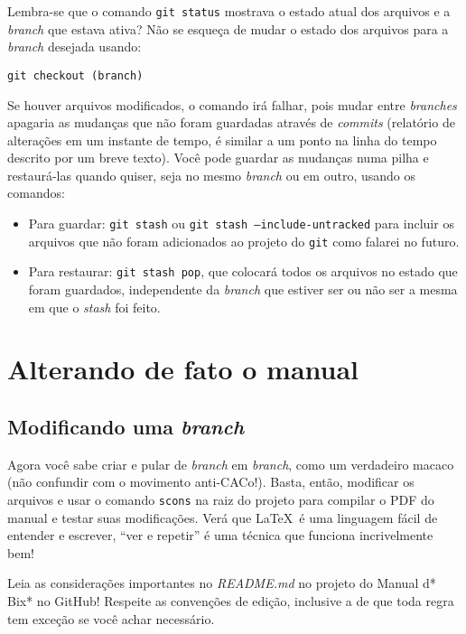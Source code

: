 \documentclass[a4paper,oneside,10pt]{memoir}
\begin{document}
Lembra-se que o comando \texttt{git status} mostrava o estado atual dos
arquivos e a \emph{branch} que estava ativa? Não se esqueça de mudar o estado
dos arquivos para a \emph{branch} desejada usando:

\begin{center}
\texttt{git checkout (branch)}
\end{center}

Se houver arquivos modificados, o comando irá falhar, pois mudar entre
\emph{branches} apagaria as mudanças que não foram guardadas através de
\emph{commits} (relatório de alterações em um instante de tempo, é similar a um
ponto na linha do tempo descrito por um breve texto). Você pode guardar as
mudanças numa pilha e restaurá-las quando quiser, seja no mesmo \emph{branch} ou
em outro, usando os comandos:

\begin{itemize}
\item Para guardar: \texttt{git stash} ou \texttt{git stash
  --include-untracked} para incluir os arquivos que não foram adicionados ao
  projeto do \texttt{git} como falarei no futuro.
\item Para restaurar: \texttt{git stash pop}, que colocará todos os arquivos
  no estado que foram guardados, independente da \emph{branch} que estiver ser
  ou não ser a mesma em que o \emph{stash} foi feito.
\end{itemize}

\section{Alterando de fato o manual}

\subsection{Modificando uma \emph{branch}}

Agora você sabe criar e pular de \emph{branch} em \emph{branch}, como um
verdadeiro macaco (não confundir com o movimento anti-CACo!). Basta, então,
modificar os arquivos e usar o comando \texttt{scons} na raiz do projeto para
compilar o PDF do manual e testar suas modificações. Verá que \LaTeX\, é uma
linguagem fácil de entender e escrever, ``ver e repetir'' é uma técnica que
funciona incrivelmente bem!

Leia as considerações importantes no \emph{README.md} no projeto do Manual d*
Bix* no GitHub! Respeite as convenções de edição, inclusive a de que toda regra
tem exceção se você achar necessário.
\end{document}
